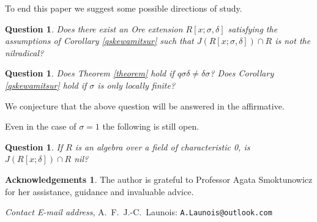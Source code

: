 \documentclass[12pt]{amsart}
\makeatletter
\newtheorem{question}[thm]{Question}
\theoremstyle{definition}
\theoremstyle{definition}
\theoremstyle{definition}
\theoremstyle{remark}
\theoremstyle{definition}
\newtheorem*{acknowledgements}{Acknowledgements}
\newcommand{\Addresses}{{%
  \bigskip
  \footnotesize

  \textit{Contact E-mail address}, A.~F.~J.-C.~Launois: \texttt{A.Launois@outlook.com}}}
\makeatother
\begin{document}
To end this paper we suggest some possible directions of study. 

\begin{question}
    Does there exist an Ore extension $R[x;\sigma,\delta]$ satisfying the assumptions of Corollary \ref{qskewamitsur} such that $J(R[x;\sigma,\delta]) \cap R$ is not the nilradical?
\end{question}

\begin{question}
    Does Theorem \ref{theorem} hold if $q\sigma\delta \neq \delta \sigma$? Does Corollary \ref{qskewamitsur} hold if $\sigma$ is only locally finite?
\end{question}

We conjecture that the above question will be answered in the affirmative.

Even in the case of $\sigma = 1$ the following is still open.

\begin{question}
    If $R$ is an algebra over a field of characteristic 0, is $J(R[x;\delta])\cap R$ nil?
\end{question}

\begin{acknowledgements}
    The author is grateful to Professor Agata Smoktunowicz for her assistance, guidance and invaluable advice.
\end{acknowledgements}


\Addresses
\end{document}
